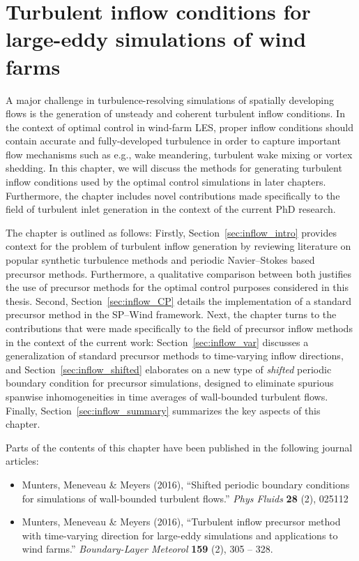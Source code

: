 \chapter{Turbulent inflow conditions for large-eddy simulations of wind farms}\label{ch:turbulent_inflow}
A major challenge in turbulence-resolving simulations of spatially developing flows is the generation of unsteady and coherent turbulent inflow conditions. In the context of optimal control in wind-farm LES, proper inflow conditions should contain accurate and fully-developed turbulence in order to capture important flow mechanisms such as e.g., wake meandering, turbulent wake mixing or vortex shedding. In this chapter, we will discuss the methods for generating turbulent inflow conditions used by the optimal control simulations in later chapters. Furthermore, the chapter includes novel contributions made specifically to the field of turbulent inlet generation in the context of the current PhD research. 

The chapter is outlined as follows: Firstly, Section~\ref{sec:inflow_intro} provides context for the problem of turbulent inflow generation by reviewing literature on popular synthetic turbulence
methods and periodic Navier--Stokes based precursor methods. Furthermore, a qualitative comparison between both justifies the use of precursor methods for the optimal control purposes considered in
this thesis. Second, Section~\ref{sec:inflow_CP} details the implementation of a standard precursor method in the SP--Wind framework. Next, the chapter turns to the contributions that were made
specifically to the field of precursor inflow methods in the context of the current work: Section~\ref{sec:inflow_var} discusses a generalization of standard precursor methods to time-varying inflow
directions, and Section~\ref{sec:inflow_shifted} elaborates on a new type of \emph{shifted} periodic boundary condition for precursor simulations,
designed to eliminate spurious spanwise inhomogeneities in time averages of wall-bounded turbulent flows.
Finally, Section~\ref{sec:inflow_summary} summarizes the key aspects of this chapter. 

Parts of the contents of this chapter have been published in the following journal articles:
\begin{itemize}
	\item Munters, Meneveau \& Meyers (2016), ``Shifted periodic boundary conditions for simulations of wall-bounded turbulent flows.'' \emph{Phys Fluids} \textbf{28} (2), 025112
	\item Munters, Meneveau \& Meyers (2016), ``Turbulent inflow precursor method with time-varying direction for large-eddy simulations and applications to wind farms.'' \emph{Boundary-Layer Meteorol} \textbf{159} (2), 305 -- 328. 
\end{itemize} 

